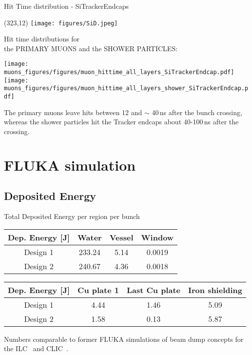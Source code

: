 \documentclass[xcolor={dvipsnames}]{beamer}
\newcommand{\sidlogo}{
  \setlength{\TPHorizModule}{1pt}
  \setlength{\TPVertModule}{1pt}
  \begin{textblock}{1}(323,12)
   \texttt{[image: figures/SiD.jpeg]}
  \end{textblock}
  }
\begin{document}
\begin{frame}{Hit Time distribution - \small SiTrackerEndcaps}
\sidlogo
Hit time distributions for \\
\hspace*{0.6cm} the PRIMARY MUONS and the SHOWER PARTICLES:
 \begin{center}
\texttt{[image: muons\_figures/figures/muon\_hittime\_all\_layers\_SiTrackerEndcap.pdf]}
\texttt{[image: muons\_figures/figures/muon\_hittime\_all\_layers\_shower\_SiTrackerEndcap.pdf]}
\end{center}
The primary muons leave hits between 12 and $\sim$ 40\,ns after the bunch crossing, whereas the shower particles hit the Tracker endcaps about 40-100\,ns after the crossing.
\end{frame}

\section{FLUKA simulation}

\subsection{Deposited Energy}
\begin{frame}{Total Deposited Energy per region per bunch}
\begin{center}
\begin{tabular}{|c|c|c|c|}
\hline
 Dep. Energy [J] & \textbf{Water} & \textbf{Vessel} & \textbf{Window} \\
\hline
Design 1 & 233.24 & 5.14 & 0.0019\\
\hline
\hline
Design 2 & 240.67 & 4.36 & 0.0018\\
\hline
\end{tabular}
\end{center}
\begin{center}
\begin{tabular}{|c|c|c|c|}
\hline
 Dep. Energy [J] & \textbf{Cu plate 1} & \textbf{Last Cu plate} & \textbf{Iron shielding} \\
\hline
Design 1 & 4.44 & 1.46 & 5.09\\
\hline
\hline
Design 2 & 1.58 & 0.13 & 5.87\\
\hline
\end{tabular}
\end{center}

Numbers comparable to former FLUKA simulations of beam dump concepts for the ILC~\cite{NIM_paper} and CLIC~\cite{CLIC_dump}.
\end{frame}
\end{document}
